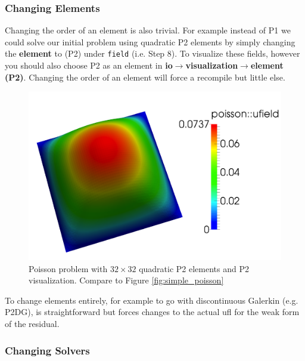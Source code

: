 \subsubsection{Changing Elements}
\label{sec:changing-meshes}

Changing the order of an element is also trivial. For example
instead of P1 we could solve our initial problem using quadratic P2
elements by simply changing the \textbf{element} to (P2) under
\texttt{field} (i.e. Step 8).  To visualize these fields, however you
should also choose P2 as an element in
\textbf{io}$\rightarrow$\textbf{visualization}$\rightarrow$\textbf{element
(P2)}.  Changing the order of an element will force a recompile but
little else.
\begin{figure}[ht!]
  \centering
  \includegraphics[width=.7\textwidth]{figures/poisson_simple_p2}
  \caption{Poisson problem with $32\times 32$ quadratic P2 elements and P2
    visualization. Compare to Figure \ref{fig:simple_poisson}}
  \label{fig:poisson-P2}
\end{figure}

To change elements entirely, for example to go with discontinuous
Galerkin (e.g. P2DG), is straightforward but forces changes to the
actual ufl for the weak form of the residual.

\subsubsection{Changing Solvers}
\label{sec:changing-solvers}

